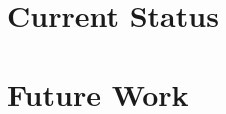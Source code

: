 \documentclass[twoside,twocolumn]{article}
\begin{document}
\section{Current Status}

\section{Future Work}







\end{document}
